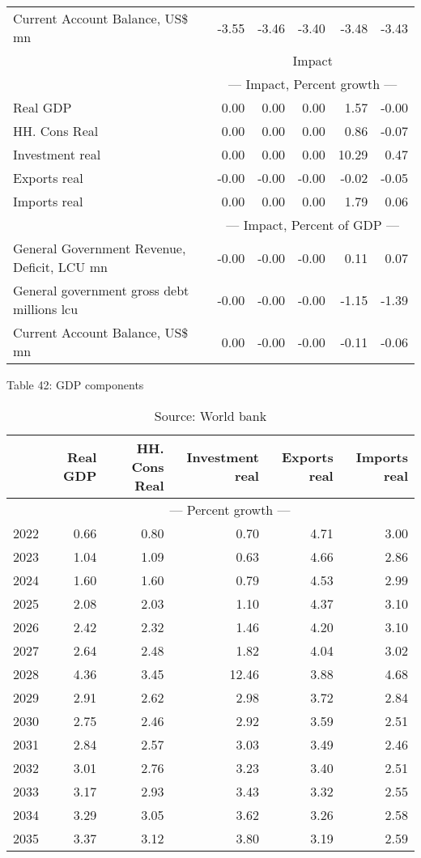 \documentclass{article}
\begin{document}
\begin{table}[ht]
\begin{tabular}{lrrrrr}
Current Account Balance, US\$ mn & -3.55 & -3.46 & -3.40 & -3.48 & -3.43 \\
&\multicolumn{5}{c}{{Impact}}                          \\
&\multicolumn{5}{c}{{--- Impact, Percent growth ---}}                          \\
Real GDP & 0.00 & 0.00 & 0.00 & 1.57 & -0.00 \\
HH. Cons Real & 0.00 & 0.00 & 0.00 & 0.86 & -0.07 \\
Investment real & 0.00 & 0.00 & 0.00 & 10.29 & 0.47 \\
Exports real & -0.00 & -0.00 & -0.00 & -0.02 & -0.05 \\
Imports real & 0.00 & 0.00 & 0.00 & 1.79 & 0.06 \\
&\multicolumn{5}{c}{{--- Impact, Percent of GDP ---}}                          \\
General Government Revenue, Deficit, LCU mn & -0.00 & -0.00 & -0.00 & 0.11 & 0.07 \\
General government gross debt millions lcu & -0.00 & -0.00 & -0.00 & -1.15 & -1.39 \\
Current Account Balance, US\$ mn & 0.00 & -0.00 & -0.00 & -0.11 & -0.06 \\
\bottomrule
\end{tabular}
\end{table}

\begin{table}[ht]
\caption{Table 42: GDP components}
\begin{tabular}{lrrrrr}
\toprule
 & Real GDP & HH. Cons Real & Investment real & Exports real & Imports real \\
\midrule
 & \multicolumn{5}{c}{--- Percent growth ---} \\
2022 & 0.66 & 0.80 & 0.70 & 4.71 & 3.00 \\
2023 & 1.04 & 1.09 & 0.63 & 4.66 & 2.86 \\
2024 & 1.60 & 1.60 & 0.79 & 4.53 & 2.99 \\
2025 & 2.08 & 2.03 & 1.10 & 4.37 & 3.10 \\
2026 & 2.42 & 2.32 & 1.46 & 4.20 & 3.10 \\
2027 & 2.64 & 2.48 & 1.82 & 4.04 & 3.02 \\
2028 & 4.36 & 3.45 & 12.46 & 3.88 & 4.68 \\
2029 & 2.91 & 2.62 & 2.98 & 3.72 & 2.84 \\
2030 & 2.75 & 2.46 & 2.92 & 3.59 & 2.51 \\
2031 & 2.84 & 2.57 & 3.03 & 3.49 & 2.46 \\
2032 & 3.01 & 2.76 & 3.23 & 3.40 & 2.51 \\
2033 & 3.17 & 2.93 & 3.43 & 3.32 & 2.55 \\
2034 & 3.29 & 3.05 & 3.62 & 3.26 & 2.58 \\
2035 & 3.37 & 3.12 & 3.80 & 3.19 & 2.59 \\
\bottomrule
\end{tabular}
\caption*{Source: World bank }
\end{table}
\end{document}
